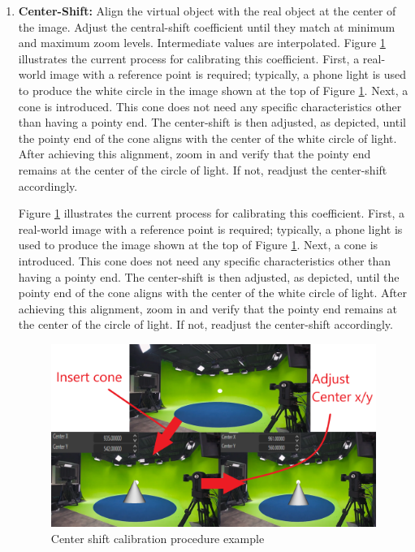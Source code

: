 \begin{enumerate}
    \item \textbf{Center-Shift:}  Align the virtual object with the real object at the center of the image.
    Adjust the central-shift coefficient until they match at minimum and maximum zoom levels.
    Intermediate values are interpolated.
    Figure \ref{fig:Cone} illustrates the current process for calibrating this coefficient. First, a real-world
    image with a reference point is required; typically, a phone light is used to produce the white circle in the
    image shown at the top of Figure \ref{fig:Cone}. Next, a cone is introduced. This cone does not
    need any specific characteristics other than having a pointy end. The center-shift is then
    adjusted, as depicted, until the pointy end of the cone aligns with the center of the white
    circle of light. After achieving this alignment, zoom in and verify that the pointy end
    remains at the center of the circle of light. If not, readjust the center-shift accordingly.

    Figure \ref{fig:Cone} illustrates the current process for calibrating this coefficient. First, a real-world image with a reference point is required; typically, a phone light is used to produce the image shown at the top of Figure \ref{fig:Cone}. Next, a cone is introduced. This cone does not need any specific characteristics other than having a pointy end. The center-shift is then adjusted, as depicted, until the pointy end of the cone aligns with the center of the white circle of light. After achieving this alignment, zoom in and verify that the pointy end remains at the center of the circle of light. If not, readjust the center-shift accordingly.
    
    \begin{figure}[h]
    \centering
    \includegraphics[width=\textwidth]{Images/01intro/Cone.png}
    \caption{Center shift calibration procedure example}
    \label{fig:Cone}
    \end{figure}
    

\end{enumerate}
